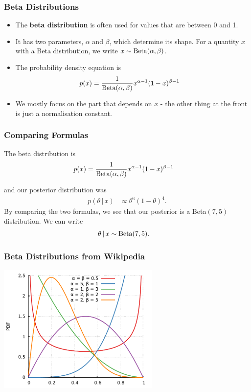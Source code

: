 \documentclass{beamer}
\newcommand{\given}{\,|\,}
\begin{document}
\begin{frame}
\frametitle{Beta Distributions}

\begin{itemize}
\item The {\bf beta distribution} is often used for values that are between 0
and 1.\pause
\item It has two parameters, $\alpha$ and $\beta$, which determine its shape.
For a quantity $x$ with a Beta distribution, we write $x \sim \textnormal{Beta}(\alpha, \beta)$.\pause
\item The probability density equation is
\begin{align}
p(x) &= \frac{1}{\textnormal{Beta}(\alpha, \beta)}
            x^{\alpha - 1}(1-x)^{\beta - 1}
\end{align} \pause
\item We mostly focus on the part that depends on $x$ - the other thing
at the front is just a normalisation constant.
\end{itemize}

\end{frame}

\begin{frame}
\frametitle{Comparing Formulas}

The beta distribution is
\begin{align}
p(x) &= \frac{1}{\textnormal{Beta}(\alpha, \beta)}
            x^{\alpha - 1}(1-x)^{\beta - 1}
\end{align}

and our posterior distribution was
\begin{align}
p(\theta \given x) &\propto \theta^6(1-\theta)^4.
\end{align}\pause
By comparing the two formulas, we see that our posterior is
a Beta$(7, 5)$ distribution. We can write
\begin{align}
\theta \given x &\sim \textnormal{Beta}(7, 5).
\end{align}

\end{frame}

\begin{frame}
\frametitle{Beta Distributions from Wikipedia}

\begin{center}
\includegraphics[width=0.6\textwidth]{images/betas.pdf}
\end{center}

\end{frame}
\end{document}
